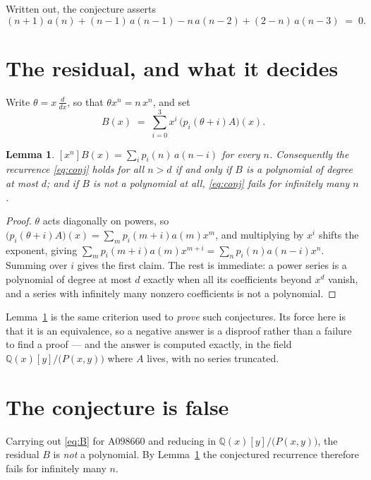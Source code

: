 \documentclass[11pt,a4paper]{article}
\theoremstyle{plain}
\newtheorem{lemma}[theorem]{Lemma}
\theoremstyle{definition}
\begin{document}
Written out, the conjecture asserts
\begin{equation}\label{eq:conj}
(n + 1)\,a(n) + (n - 1)\,a(n-1) -  n\,a(n-2) + (2 - n)\,a(n-3)\;=\;0 .
\end{equation}

\section{The residual, and what it decides}

Write $\theta=x\,\frac{d}{dx}$, so that $\theta x^{n}=n\,x^{n}$, and set
\begin{equation}\label{eq:B}
B(x)\;=\;\sum_{i=0}^{3}x^{i}\,\bigl(p_{i}(\theta+i)A\bigr)(x).
\end{equation}

\begin{lemma}\label{lem:transfer}
$[x^{n}]B(x)=\sum_{i}p_{i}(n)\,a(n-i)$ for every $n$. Consequently the recurrence
\eqref{eq:conj} holds for all $n>d$ if and only if $B$ is a polynomial of degree at most
$d$; and if $B$ is not a polynomial at all, \eqref{eq:conj} fails for infinitely many $n$.
\end{lemma}

\begin{proof}
$\theta$ acts diagonally on powers, so $\bigl(p_{i}(\theta+i)A\bigr)(x)
=\sum_{m}p_{i}(m+i)a(m)x^{m}$, and multiplying by $x^{i}$ shifts the exponent, giving
$\sum_{m}p_{i}(m+i)a(m)x^{m+i}=\sum_{n}p_{i}(n)a(n-i)x^{n}$. Summing over $i$ gives the
first claim. The rest is immediate: a power series is a polynomial of degree at most $d$
exactly when all its coefficients beyond $x^{d}$ vanish, and a series with infinitely many
nonzero coefficients is not a polynomial.
\end{proof}

Lemma~\ref{lem:transfer} is the same criterion used to \emph{prove} such conjectures. Its
force here is that it is an equivalence, so a negative answer is a disproof rather than a
failure to find a proof --- and the answer is computed exactly, in the field
$\mathbb{Q}(x)[y]/\bigl(P(x,y)\bigr)$ where $A$ lives, with no series truncated.

\section{The conjecture is false}

Carrying out \eqref{eq:B} for A098660 and reducing in $\mathbb{Q}(x)[y]/\bigl(P(x,y)\bigr)$, the residual $B$ is
\emph{not} a polynomial. By Lemma~\ref{lem:transfer} the conjectured recurrence therefore
fails for infinitely many $n$.
\end{document}
